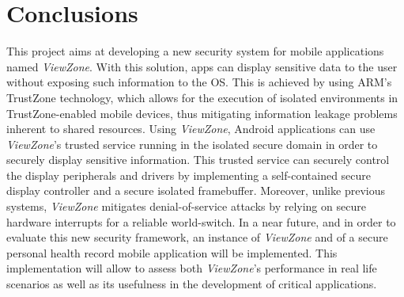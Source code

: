 
% 
% 

\section{Conclusions}
\label{sec:conclusion}

This project aims at developing a new security system for mobile applications named \emph{ViewZone}. With this solution, apps can display sensitive data to the user without exposing such information to the OS. This is achieved by using ARM's TrustZone technology, which allows for the execution of isolated environments in TrustZone-enabled mobile devices, thus mitigating information leakage problems inherent to shared resources. Using \emph{ViewZone}, Android applications can use \emph{ViewZone}'s trusted service running in the isolated secure domain in order to securely display sensitive information. This trusted service can securely control the display peripherals and drivers by implementing a self-contained secure display controller and a secure isolated framebuffer. Moreover, unlike previous systems, \emph{ViewZone} mitigates denial-of-service attacks by relying on secure hardware interrupts for a reliable world-switch. In a near future, and in order to evaluate this new security framework, an instance of \emph{ViewZone} and of a secure personal health record mobile application will be implemented. This implementation will allow to assess both \emph{ViewZone}'s performance in real life scenarios as well as its usefulness in the development of critical applications.